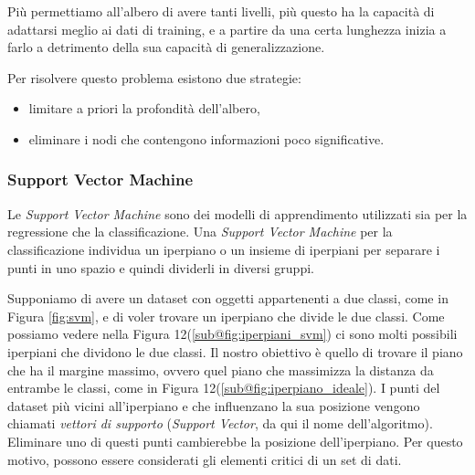 \documentclass[a4paper,12pt]{report}
\begin{document}
Più permettiamo all’albero di avere tanti livelli, più questo ha la capacità di adattarsi meglio ai dati di training, e a partire da una certa lunghezza inizia a farlo a detrimento della sua capacità di generalizzazione. 

Per risolvere questo problema esistono due strategie:
\begin{itemize}
    \item limitare a priori la profondità dell'albero, 
    \item eliminare i nodi che contengono informazioni poco significative.
\end{itemize}


\subsubsection{Support Vector Machine}
Le \textit{Support Vector Machine} sono dei modelli di apprendimento utilizzati sia per la regressione che la classificazione.
Una \textit{Support Vector Machine} \cite{SVM} per la classificazione individua un iperpiano o un insieme di iperpiani per separare i punti in uno spazio e quindi dividerli in diversi gruppi.

Supponiamo di avere un dataset con oggetti appartenenti a due classi, come in Figura \ref{fig:svm}, e di voler trovare un iperpiano che divide le due classi. Come possiamo vedere nella Figura 12(\ref{sub@fig:iperpiani_svm}) ci sono molti possibili iperpiani che dividono le due classi. Il nostro obiettivo è quello di trovare il piano che ha il margine massimo, ovvero quel piano che massimizza la distanza da entrambe le classi, come in Figura 12(\ref{sub@fig:iperpiano_ideale}). I punti del dataset più vicini all'iperpiano e che influenzano la sua posizione vengono chiamati \textit{vettori di supporto} (\textit{Support Vector}, da qui il nome dell'algoritmo). Eliminare uno di questi punti cambierebbe la posizione dell'iperpiano. Per questo motivo, possono essere considerati gli elementi critici di un set di dati.
\end{document}
